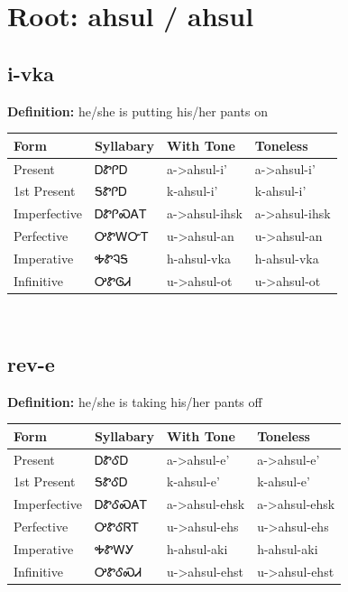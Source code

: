 \documentclass{article}%
\begin{document}
%
\normalsize%
\section*{Root: ahsul / ahsul}%
\subsection*{i-vka}%
\textbf{Definition: }%
he/she is putting his/her pants on%
\\[0.5em]%
\begin{tabular}{|l|l|l|l|}%
\hline%
\textbf{Form}&\textbf{Syllabary}&\textbf{With Tone}&\textbf{Toneless}\\%
\hline%
Present&ᎠᏑᎵᎠ&a{-}>ahsul{-}i'&a{-}>ahsul{-}i'\\%
1st Present&ᎦᏑᎵᎠ&k{-}ahsul{-}i'&k{-}ahsul{-}i'\\%
Imperfective&ᎠᏑᎵᏍᎪᎢ&a{-}>ahsul{-}ihsk&a{-}>ahsul{-}ihsk\\%
Perfective&ᎤᏑᎳᏅᎢ&u{-}>ahsul{-}an&u{-}>ahsul{-}an\\%
Imperative&ᎭᏑᎸᎦ&h{-}ahsul{-}vka&h{-}ahsul{-}vka\\%
Infinitive&ᎤᏑᎶᏗ&u{-}>ahsul{-}ot&u{-}>ahsul{-}ot\\%
\hline%
\end{tabular}%
\\[1em]%
\subsection*{rev-e}%
\textbf{Definition: }%
he/she is taking his/her pants off%
\\[0.5em]%
\begin{tabular}{|l|l|l|l|}%
\hline%
\textbf{Form}&\textbf{Syllabary}&\textbf{With Tone}&\textbf{Toneless}\\%
\hline%
Present&ᎠᏑᎴᎠ&a{-}>ahsul{-}e'&a{-}>ahsul{-}e'\\%
1st Present&ᎦᏑᎴᎠ&k{-}ahsul{-}e'&k{-}ahsul{-}e'\\%
Imperfective&ᎠᏑᎴᏍᎪᎢ&a{-}>ahsul{-}ehsk&a{-}>ahsul{-}ehsk\\%
Perfective&ᎤᏑᎴᏒᎢ&u{-}>ahsul{-}ehs&u{-}>ahsul{-}ehs\\%
Imperative&ᎭᏑᎳᎩ&h{-}ahsul{-}aki&h{-}ahsul{-}aki\\%
Infinitive&ᎤᏑᎴᏍᏗ&u{-}>ahsul{-}ehst&u{-}>ahsul{-}ehst\\%
\hline%
\end{tabular}%
\\[1em]%
\end{document}
